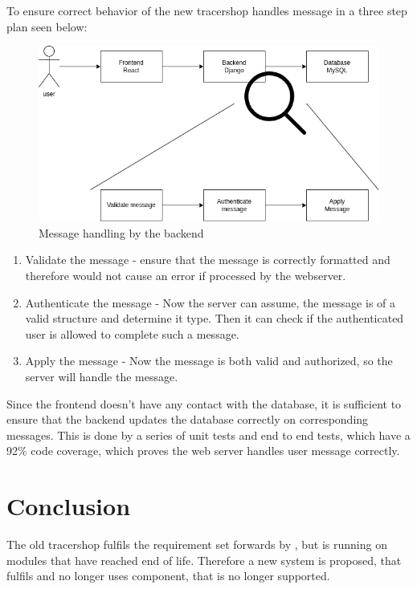 \documentclass{article}
\begin{document}
To ensure correct behavior of the new tracershop handles message in a three step plan seen below:

\begin{figure}[ht]
  \begin{center}
    \includegraphics[width=0.6\linewidth]{MessageHandeling.png}
    \caption{Message handling by the backend}
  \end{center}
\end{figure}

\begin{enumerate}
  \item Validate the message - ensure that the message is correctly formatted and therefore would not cause an error if processed by the webserver.
  \item Authenticate the message - Now the server can assume, the message is of a valid structure and determine it type.
  Then it can check if the authenticated user is allowed to complete such a message.
  \item Apply the message - Now the message is both valid and authorized, so the server will handle the message.
\end{enumerate}

Since the frontend doesn't have any contact with the database,
it is sufficient to ensure that the backend updates the database correctly on corresponding messages.
This is done by a series of unit tests and end to end tests, which have a 92\% code coverage,
which proves the web server handles user message correctly.

\section*{Conclusion}
The old tracershop fulfils the requirement set forwards by , but is running on modules that have reached end of life.
Therefore a new system is proposed, that fulfils  and no longer uses component, that is no longer supported.






\clearpage

\printglossaries
\end{document}
